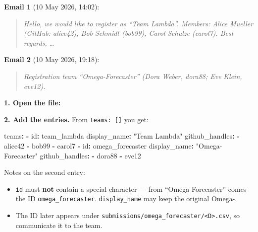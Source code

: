 \documentclass[
  english,
  letterpaper,
]{scrbook}
\newenvironment{Shaded}{\begin{snugshade}}{\end{snugshade}}
\newcommand{\AttributeTok}[1]{\textcolor[rgb]{0.40,0.45,0.13}{#1}}
\newcommand{\BuiltInTok}[1]{\textcolor[rgb]{0.00,0.23,0.31}{#1}}
\newcommand{\FunctionTok}[1]{\textcolor[rgb]{0.28,0.35,0.67}{#1}}
\newcommand{\KeywordTok}[1]{\textcolor[rgb]{0.00,0.23,0.31}{\textbf{#1}}}
\newcommand{\NormalTok}[1]{\textcolor[rgb]{0.00,0.23,0.31}{#1}}
\newcommand{\StringTok}[1]{\textcolor[rgb]{0.13,0.47,0.30}{#1}}
\newcommand{\VariableTok}[1]{\textcolor[rgb]{0.07,0.07,0.07}{#1}}
\providecommand{\tightlist}{%
  \setlength{\itemsep}{0pt}\setlength{\parskip}{0pt}}
\begin{document}
\textbf{Email 1} (10 May 2026, 14:02):

\begin{quote}
\emph{Hello, we would like to register as ``Team Lambda''. Members:}
\emph{Alice Mueller (GitHub: alice42), Bob Schmidt (bob99), Carol}
\emph{Schulze (carol7). Best regards, \ldots{}}
\end{quote}

\textbf{Email 2} (10 May 2026, 19:18):

\begin{quote}
\emph{Registration team ``Omega-Forecaster'' (Dora Weber, dora88; Eve}
\emph{Klein, eve12).}
\end{quote}

\textbf{1. Open the file:}

\begin{Shaded}
\end{Shaded}

\textbf{2. Add the entries.} From \texttt{teams:\ {[}{]}} you get:

\begin{Shaded}
\begin{Highlighting}[]
\FunctionTok{teams}\KeywordTok{:}
\AttributeTok{  }\KeywordTok{{-}}\AttributeTok{ }\FunctionTok{id}\KeywordTok{:}\AttributeTok{ team\_lambda}
\AttributeTok{    }\FunctionTok{display\_name}\KeywordTok{:}\AttributeTok{ }\StringTok{"Team Lambda"}
\AttributeTok{    }\FunctionTok{github\_handles}\KeywordTok{:}
\AttributeTok{      }\KeywordTok{{-}}\AttributeTok{ alice42}
\AttributeTok{      }\KeywordTok{{-}}\AttributeTok{ bob99}
\AttributeTok{      }\KeywordTok{{-}}\AttributeTok{ carol7}
\AttributeTok{  }\KeywordTok{{-}}\AttributeTok{ }\FunctionTok{id}\KeywordTok{:}\AttributeTok{ omega\_forecaster}
\AttributeTok{    }\FunctionTok{display\_name}\KeywordTok{:}\AttributeTok{ }\StringTok{"Omega{-}Forecaster"}
\AttributeTok{    }\FunctionTok{github\_handles}\KeywordTok{:}
\AttributeTok{      }\KeywordTok{{-}}\AttributeTok{ dora88}
\AttributeTok{      }\KeywordTok{{-}}\AttributeTok{ eve12}
\end{Highlighting}
\end{Shaded}

Notes on the second entry:

\begin{itemize}
\tightlist
\item
  \texttt{id} must \textbf{not} contain a special character --- from
  ``Omega-Forecaster'' comes the ID \texttt{omega\_forecaster}.
  \texttt{display\_name} may keep the original Omega-.
\item
  The ID later appears under
  \texttt{submissions/omega\_forecaster/\textless{}D\textgreater{}.csv},
  so communicate it to the team.
\end{itemize}
\end{document}
